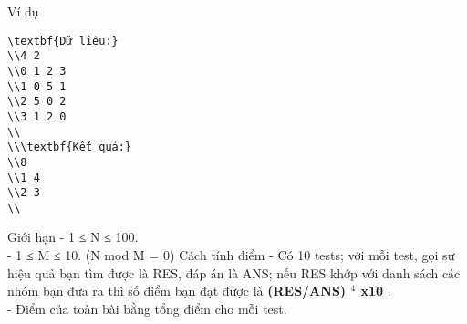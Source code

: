 Ví dụ
\begin{verbatim}
\textbf{Dữ liệu:}
\\4 2
\\0 1 2 3
\\1 0 5 1
\\2 5 0 2
\\3 1 2 0
\\
\\\textbf{Kết quả:}
\\8
\\1 4
\\2 3
\\\end{verbatim}
Giới hạn
- 1 ≤ N ≤ 100.   
\\   - 1 ≤ M ≤ 10. (N mod M = 0)
Cách tính điểm
- Có 10 tests; với mỗi test, gọi sự hiệu quả bạn tìm được là RES, đáp án là ANS; nếu RES khớp với danh sách các nhóm bạn đưa ra thì số điểm bạn đạt được là   \textbf{    (RES/ANS)    $^     4    $    x10   }   .   
\\   - Điểm của toàn bài bằng tổng điểm cho mỗi test.